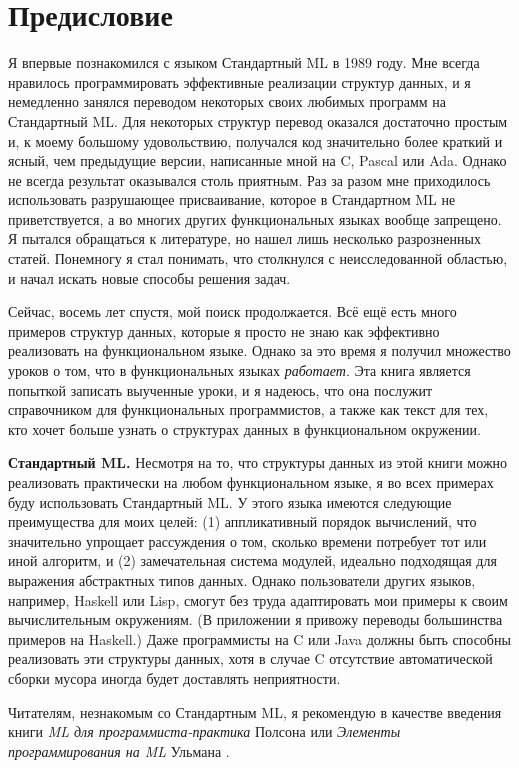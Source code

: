 \chapter*{Предисловие}

Я впервые познакомился с языком Стандартный ML в 1989 году. Мне всегда
нравилось программировать эффективные реализации структур данных,
и я немедленно занялся переводом некоторых своих любимых программ
на Стандартный ML. Для некоторых структур перевод оказался достаточно
простым и, к моему большому удовольствию, получался код значительно более краткий
и ясный, чем предыдущие версии, написанные мной на C, Pascal или
Ada.  Однако не всегда результат оказывался столь приятным. Раз за
разом мне приходилось использовать разрушающее присваивание, которое в
Стандартном ML не приветствуется, а во многих других функциональных
языках вообще запрещено.  Я пытался обращаться к литературе, но
нашел лишь несколько разрозненных статей.  Понемногу я стал понимать,
что столкнулся с неисследованной областью, и начал искать новые
способы решения задач.

Сейчас, восемь лет спустя, мой поиск продолжается. Всё ещё есть много
примеров структур данных, которые я просто не знаю как эффективно
реализовать на функциональном языке. Однако за это время я получил
множество уроков о том, что в функциональных языках
\textit{работает}.  Эта книга является попыткой записать выученные
уроки, и я надеюсь, что она послужит справочником для функциональных
программистов, а также как текст для тех, кто хочет больше узнать о
структурах данных в функциональном окружении.

\textbf{Стандартный ML.} Несмотря на то, что структуры данных из этой
книги можно реализовать практически на любом функциональном языке, я
во всех примерах буду использовать Стандартный ML.  У этого языка
имеются следующие преимущества для моих целей: (1)  аппликативный
порядок вычислений, что значительно упрощает рассуждения о том,
сколько времени потребует тот или иной алгоритм, и (2) замечательная
система модулей, идеально подходящая для выражения абстрактных типов
данных.  Однако пользователи других языков, например, Haskell или
Lisp, смогут без труда адаптировать мои примеры к своим вычислительным
окружениям. (В приложении я привожу переводы большинства примеров на
Haskell.) Даже программисты на C или Java должны быть способны
реализовать эти структуры данных, хотя в случае C отсутствие
автоматической сборки мусора иногда будет доставлять неприятности.

Читателям, незнакомым со Стандартным ML, я рекомендую в качестве
введения книги \textit{ML для программиста-практика} Полсона
\cite{Paulson1996} или \textit{Элементы программирования на ML}
Ульмана \cite{Ullman1994}.

